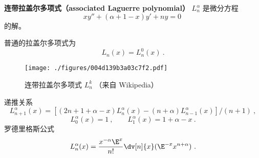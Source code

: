 
\begin{issues}
\issueDraft
\end{issues}

\textbf{连带拉盖尔多项式（associated Laguerre polynomial）} $L_{n}^\alpha$ 是微分方程
\begin{equation}
xy'' + (\alpha + 1 - x) y' + ny = 0~
\end{equation}
的解。

普通的拉盖尔多项式为
\begin{equation}
L_n(x) = L_n^0(x)~.
\end{equation}

\begin{figure}[ht]
\centering
\texttt{[image: ./figures/004d139b3a03c7f2.pdf]}
\caption{连带拉盖尔多项式 $L_n^k$ （来自 Wikipedia）} \label{fig_Laguer_1}
\end{figure}

递推关系
\begin{equation}
L_{n+1}^\alpha (x) = [(2n + 1 + \alpha  - x)L_n^\alpha (x) - (n + \alpha )L_{n - 1}^\alpha (x)]/(n + 1)~,
\end{equation}
\begin{equation}
L_0^\alpha (x) = 1~,
\qquad
L_1^\alpha (x) = 1 + \alpha  - x~.
\end{equation}  
罗德里格斯公式
\begin{equation}
L_n^\alpha (x) = \frac{x^{-\alpha} \E^x}{n!} \dv[n]{x} (\E^{-x} x^{n+\alpha})~.
\end{equation}
